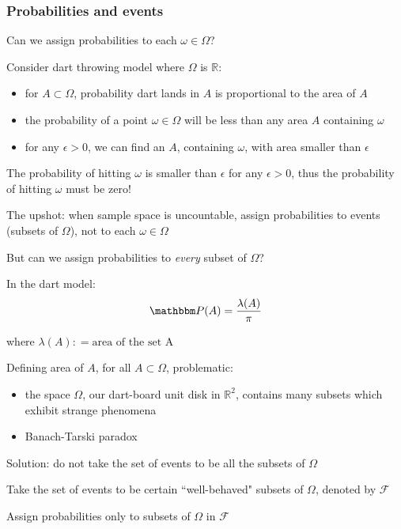 \begin{frame}
    \frametitle{Probabilities and events}
    
    \vspace{2em}
    Can we assign probabilities to each $\omega\in \Omega$?
    
    Consider dart throwing model where $\Omega$ is $\mathbb{R}$:
    \begin{itemize}
        \item for $A\subset \Omega$, probability dart lands in $A$ is 
                proportional to the area of $A$
        \item the probability of a point $\omega \in \Omega$ will be less 
                than any area $A$ containing $\omega$
        \item for any $\epsilon>0$, we can find an $A$, containing $\omega$, 
                with area smaller than $\epsilon$
    \end{itemize}
    
    The probability of hitting $\omega$ is smaller than $\epsilon$ for 
    any $\epsilon >0$, thus the probability of hitting $\omega$ must be zero!
    
\end{frame}

\begin{frame}

    \vspace{2em}
    The upshot: when sample space is uncountable, assign probabilities to events (subsets of $\Omega$), 
    not to each $\omega\in \Omega$
    
    But can we assign probabilities to \emph{every} subset of $\Omega$? 
    
    In the dart model:
    \begin{equation*}
        \PP(A) = \frac{\lambda(A)}{\pi} 
    \end{equation*}
    
    where $\lambda(A)\colon = \text{area of the set A}$

\end{frame}

\begin{frame}

    \vspace{2em}
    Defining area of $A$, for all $A\subset \Omega$, problematic:
    
    \begin{itemize}
        \item the space $\Omega$, our dart-board unit disk in $\mathbb{R}^{2}$, 
        contains many subsets which exhibit strange phenomena
        \item Banach-Tarski paradox 
    \end{itemize}

    Solution: do not take the set of events to be all the subsets of $\Omega$
    
    Take the set of events to be certain ``well-behaved" subsets of $\Omega$, denoted by $\mathscr{F}$

    Assign probabilities only to subsets of $\Omega$ in $\mathscr{F}$

\end{frame}

